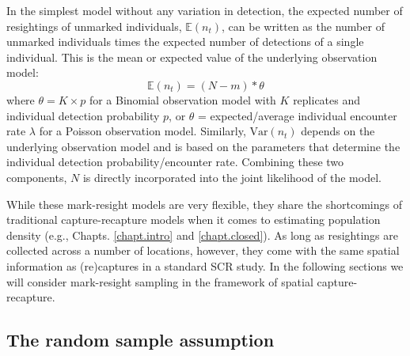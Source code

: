 In the simplest model without any variation in detection, the expected
number of resightings of unmarked individuals, $\mathbb{E}(n_t)$, can
be written as the number of unmarked individuals times the expected
number of detections of a single individual.  This is the mean or
expected value of the underlying observation model:
\begin{equation}
\mathbb{E}(n_t) = (N-m) * \theta
\end{equation}
\label{partialID.eq.E_n}
where $\theta = K \times p$ for a Binomial observation model with $K$
replicates and individual detection probability $p$, or $\theta$ =
expected/average individual encounter rate $\lambda$ for a Poisson
observation model. Similarly, $\mbox{Var}(n_t)$ depends on the
underlying observation model and is based on the parameters that
determine the individual detection probability/encounter
rate. Combining these two components, $N$ is directly incorporated
into the joint likelihood of the model.

While these mark-resight models are very flexible, they share the
shortcomings of traditional capture-recapture models when it comes to
estimating population density (e.g., Chapts. \ref{chapt.intro} and
\ref{chapt.closed}). As long as resightings are collected across a
number of locations, however, they come with the same spatial
information as (re)captures in a standard SCR study.  In the following
sections we will consider mark-resight sampling in the framework of
spatial capture-recapture.


\subsection {The random sample assumption}
\label{partialID.sec.random}

